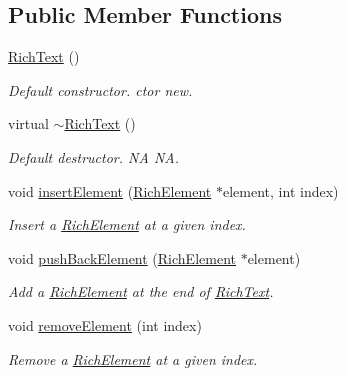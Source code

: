 \subsection*{Public Member Functions}
\begin{DoxyCompactItemize}
\item 
\mbox{\label{classui_1_1RichText_a52853cd9bda30569081d5ba8507205be}} 
\hyperlink{classui_1_1RichText_a52853cd9bda30569081d5ba8507205be}{Rich\+Text} ()
\begin{DoxyCompactList}\small\item\em Default constructor.  ctor  new. \end{DoxyCompactList}\item 
\mbox{\label{classui_1_1RichText_a4d75c5a3bda55c939407ecf1e0601793}} 
virtual \hyperlink{classui_1_1RichText_a4d75c5a3bda55c939407ecf1e0601793}{$\sim$\+Rich\+Text} ()
\begin{DoxyCompactList}\small\item\em Default destructor.  NA  NA. \end{DoxyCompactList}\item 
void \hyperlink{classui_1_1RichText_a60507d7854a4d1ac99722d9c0ff5237b}{insert\+Element} (\hyperlink{classui_1_1RichElement}{Rich\+Element} $\ast$element, int index)
\begin{DoxyCompactList}\small\item\em Insert a \hyperlink{classui_1_1RichElement}{Rich\+Element} at a given index. \end{DoxyCompactList}\item 
void \hyperlink{classui_1_1RichText_a94dcc56e14381d00fa01b185cd797037}{push\+Back\+Element} (\hyperlink{classui_1_1RichElement}{Rich\+Element} $\ast$element)
\begin{DoxyCompactList}\small\item\em Add a \hyperlink{classui_1_1RichElement}{Rich\+Element} at the end of \hyperlink{classui_1_1RichText}{Rich\+Text}. \end{DoxyCompactList}\item 
void \hyperlink{classui_1_1RichText_a1bb5065db5ec47543bc3cf80eb5cda44}{remove\+Element} (int index)
\begin{DoxyCompactList}\small\item\em Remove a \hyperlink{classui_1_1RichElement}{Rich\+Element} at a given index. \end{DoxyCompactList}\item 

\end{DoxyCompactItemize}
